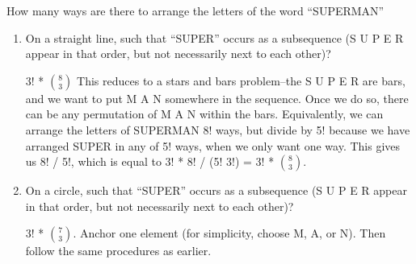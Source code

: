 \question How many ways are there to arrange the letters of the word 
“SUPERMAN”
\begin{enumerate}[label=(\alph*)]

\item On a straight line, such that “SUPER” occurs as a subsequence 
(S U P E R appear in that order, but not necessarily next to each other)? 
\begin{solution} 3! * ${8 \choose 3}$
This reduces to a stars and bars problem--the S U P E R are bars, and 
we want to put M A N somewhere in the sequence. Once we do so, there 
can be any permutation of M A N within the bars.
Equivalently, we can arrange the letters of SUPERMAN 8! ways, but 
divide by 5! because we have arranged SUPER in any of 5! ways, when 
we only want one way. This gives us 8! / 5!, which is equal to 
3! * 8! / (5! 3!) = 3! * ${8 \choose 3}$.
 \end{solution}

\item On a circle, such that “SUPER” occurs as a subsequence (S U P E R 
appear in that order, but not necessarily next to each other)?
\begin{solution} [2 mm] 3! * ${7 \choose 3}$.
Anchor one element (for simplicity, choose M, A, or N). Then follow the same procedures as earlier.
\end{solution}

\end{enumerate}